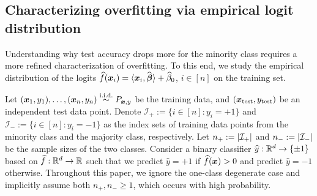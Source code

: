 \subsection{Characterizing overfitting via empirical logit distribution}
\label{subsec:ELD}

Understanding why test accuracy drops more for the minority class requires a more refined characterization of overfitting. To this end, we study the empirical distribution of the logits $\widehat f({\boldsymbol{x}}_i) = \langle {\boldsymbol{x}}_i, \widehat{{\boldsymbol{\beta}}} \rangle + \widehat \beta_0$, $i \in [n]$ on the training set. 

Let $(\text{\boldmath $x$}_1, y_1), \ldots, (\text{\boldmath $x$}_n, y_n) \overset{\text{i.i.d.}}{\sim} P_{\text{\boldmath $x$}, y}$ be the training data, and $({\boldsymbol{x}}_\mathrm{test}, y_\mathrm{test})$ be an independent test data point. Denote $\mathcal{I}_+ := \{ i \in [n]: y_i = +1 \}$ and $\mathcal{I}_- := \{ i \in [n]: y_i = -1 \}$ as the index sets of training data points from the minority class and the majority class, respectively. Let $n_+ := \left|{\mathcal{I}_+}\right|$ and $n_- := \left|{\mathcal{I}_-}\right|$ be the sample sizes of the two classes. Consider a binary classifier $\widehat{y}: \mathbb{R}^d \to \{ \pm 1 \}$ based on $\widehat f: \mathbb{R}^d \to \mathbb{R}$ such that we predict $\hat y = + 1$ if $\widehat f({\boldsymbol{x}}) > 0$ and predict $\hat y=-1$ otherwise. Throughout this paper, we ignore the one-class degenerate case and implicitly assume both $n_+, n_- \ge 1$, which occurs with high probability.



